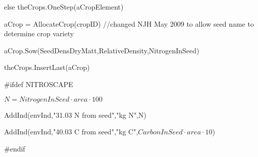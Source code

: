 \documentclass[%
]{scrartcl}
\begin{document}
    \quad   \quad    else
      theCrops.OneStep(aCropElement)
   


	aCrop = AllocateCrop(cropID)  
   //changed NJH May 2009 to allow seed name to determine crop variety
	
 aCrop.Sow(SeedDensDryMatt,RelativeDensity,NitrogenInSeed)
	
theCrops.InsertLast(aCrop)

\#ifdef NITROSCAPE

       $ N=NitrogenInSeed \cdot area  \cdot  100$
     
 AddInd(envInd,"31.03 N from seed","kg N",N)
      
AddInd(envInd,"40.03 C from seed","kg C",$CarbonInSeed \cdot area \cdot 10$)

\#endif
\end{document}
